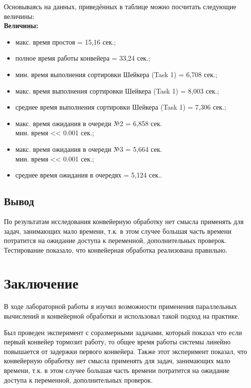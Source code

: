 \documentclass[12pt]{report}
\begin{document}
\newpage
Основываясь на данных, приведённых в таблице можно посчитать следующие величины:\\
\textbf{Величины:}
\begin{itemize}
	\item макс. время простоя = 15,16 сек.;
	\item полное время работы конвейера = 33,24 сек.;
	\item мин. время выполнения сортировки Шейкера (Task 1) = 6,708 сек.;
	\item макс. время выполнения сортировки Шейкера (Task 1) =  8,003 сек.;
	\item среднее время выполнения сортировки Шейкера (Task 1) =  7,306 сек.;
	\item макс. время ожидания в очереди №2 = 6,858 сек. \\
	 мин. время << 0.001 сек.;
	\item макс. время ожидания в очереди №3 = 5,664 сек. \\
	 мин. время << 0.001 сек.;
	\item среднее время ожидания в очередях = 5,124 сек..
\end{itemize}

\section{Вывод}
По результатам исследования конвейерную обработку нет смысла применять для задач, занимающих мало времени, т.к. в этом случее большая часть времени
потратится на ожидание доступа к переменной, дополнительных проверок.
Тестирование показало, что конвейерная обработка реализована правильно.

\chapter*{Заключение}
В ходе лабораторной работы я изучил возможности применения параллельных вычислений и конвейерной обработки и использовал такой подход на практике. 

Был проведен эксперимент с соразмерными задачами, который показал что если первый конвейер тормозит работу, то общее время работы системы линейно повышается от задержки первого конвейера. Также этот эксперимент показал, что конвейерную обработку нет смысла применять для задач, занимающих мало времени, т.к. в этом случее большая часть времени потратится на ожидание доступа к переменной, дополнительных проверок.
\end{document}
